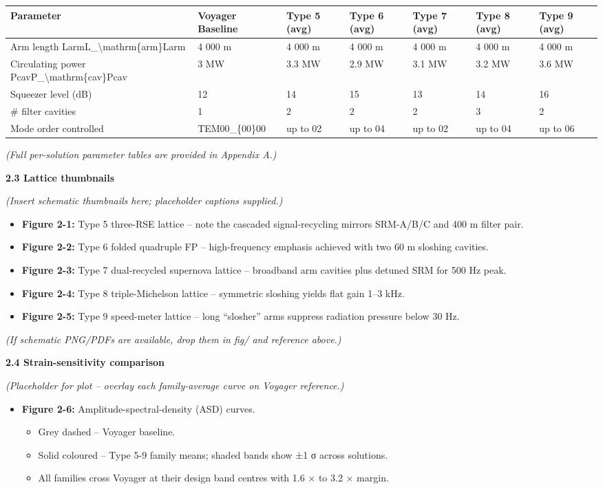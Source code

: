 \documentclass[]{article}
\begin{document}
\begin{longtable}[]{@{}lllllll@{}}
\toprule
\textbf{Parameter} & \textbf{Voyager Baseline} & \textbf{Type 5 (avg)} &
\textbf{Type 6 (avg)} & \textbf{Type 7 (avg)} & \textbf{Type 8 (avg)} &
\textbf{Type 9 (avg)}\tabularnewline
\midrule
\endhead
Arm length LarmL\_\textbackslash{}mathrm\{arm\}Larm​ & 4 000 m & 4 000 m
& 4 000 m & 4 000 m & 4 000 m & 4 000 m\tabularnewline
Circulating power PcavP\_\textbackslash{}mathrm\{cav\}Pcav​ & 3 MW & 3.3
MW & 2.9 MW & 3.1 MW & 3.2 MW & 3.6 MW\tabularnewline
Squeezer level (dB) & 12 & 14 & 15 & 13 & 14 & 16\tabularnewline
\# filter cavities & 1 & 2 & 2 & 2 & 3 & 2\tabularnewline
Mode order controlled & TEM00\_\{00\}00​ & up to 02 & up to 04 & up to
02 & up to 04 & up to 06\tabularnewline
\bottomrule
\end{longtable}

\emph{(Full per-solution parameter tables are provided in Appendix A.)}

\textbf{2.3 Lattice thumbnails}

\emph{(Insert schematic thumbnails here; placeholder captions
supplied.)}

\begin{itemize}
\item
  \textbf{Figure 2-1:} Type 5 three-RSE lattice -- note the cascaded
  signal-recycling mirrors SRM-A/B/C and 400 m filter pair.
\item
  \textbf{Figure 2-2:} Type 6 folded quadruple FP -- high-frequency
  emphasis achieved with two 60 m sloshing cavities.
\item
  \textbf{Figure 2-3:} Type 7 dual-recycled supernova lattice --
  broadband arm cavities plus detuned SRM for 500 Hz peak.
\item
  \textbf{Figure 2-4:} Type 8 triple-Michelson lattice -- symmetric
  sloshing yields flat gain 1--3 kHz.
\item
  \textbf{Figure 2-5:} Type 9 speed-meter lattice -- long ``slosher''
  arms suppress radiation pressure below 30 Hz.
\end{itemize}

\emph{(If schematic PNG/PDFs are available, drop them in fig/ and
reference above.)}

\textbf{2.4 Strain-sensitivity comparison}

\emph{(Placeholder for plot -- overlay each family-average curve on
Voyager reference.)}

\begin{itemize}
\item
  \textbf{Figure 2-6:} Amplitude-spectral-density (ASD) curves.

  \begin{itemize}
  \item
    Grey dashed -- Voyager baseline.
  \item
    Solid coloured -- Type 5-9 family means; shaded bands show ±1 σ
    across solutions.
  \item
    All families cross Voyager at their design band centres with 1.6 ×
    to 3.2 × margin.
  \end{itemize}
\end{itemize}
\end{document}
